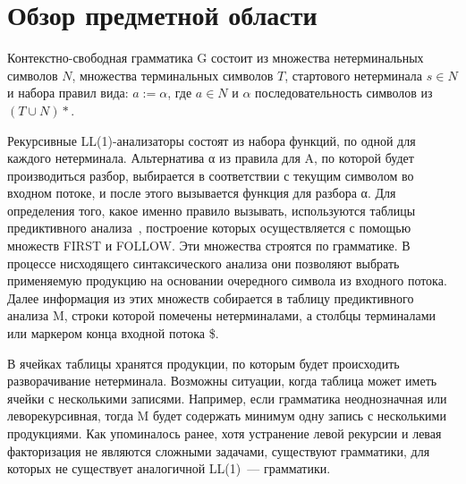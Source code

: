 \section{Обзор предметной области}
Контекстно-свободная грамматика G состоит из множества нетерминальных символов $N$, множества терминальных символов $T$, стартового нетерминала $s \in N$  и набора правил вида:  $a := \alpha$, где $a \in N$ и $\alpha$ последовательность символов из  $(T \cup N)\ast$.

Рекурсивные LL(1)-анализаторы состоят из набора функций, по одной для каждого нетерминала. Альтернатива α из правила для A,  по которой будет производиться разбор, выбирается в соответствии с текущим символом во входном потоке,  и после этого вызывается функция для разбора α. Для определения того, какое именно правило вызывать, используются таблицы предиктивного анализа~\cite{aho}, построение которых осуществляется с помощью множеств FIRST и FOLLOW. Эти множества строятся по грамматике. В процессе нисходящего синтаксического анализа они позволяют выбрать применяемую продукцию на основании очередного символа из входного потока. Далее информация из этих множеств собирается в таблицу предиктивного анализа M, строки которой помечены нетерминалами, а столбцы терминалами или маркером конца входной потока \$.

В ячейках таблицы хранятся продукции, по которым будет происходить разворачивание нетерминала. Возможны ситуации, когда таблица может иметь ячейки с несколькими записями. Например, если грамматика неоднозначная или леворекурсивная, тогда M будет содержать минимум одну запись с несколькими продукциями. Как упоминалось ранее, хотя устранение левой рекурсии и левая факторизация не являются сложными задачами, существуют  грамматики, для которых не существует аналогичной LL(1)~--- грамматики.

